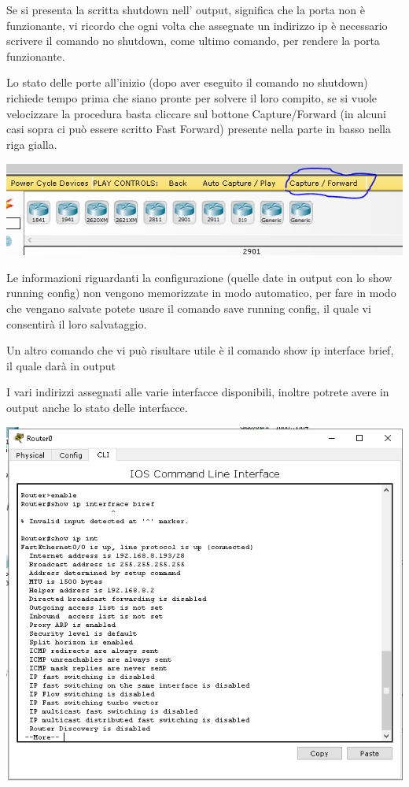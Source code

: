 Se si presenta la scritta shutdown nell’ output, significa che la porta non è funzionante, vi ricordo che ogni volta che assegnate un indirizzo ip è necessario scrivere il comando no shutdown, come ultimo comando, per rendere la porta funzionante.

Lo stato delle porte all'inizio (dopo aver eseguito il comando no shutdown) richiede tempo prima che siano pronte per solvere il loro compito, se si vuole velocizzare la procedura basta cliccare sul bottone Capture/Forward (in alcuni casi sopra ci può essere scritto Fast Forward) presente nella parte in basso nella riga gialla.

\begin{center}
    \includegraphics[width=\linewidth]{images/04.debugging-rete/02.png}
\end{center}

Le informazioni riguardanti la configurazione (quelle date in output con lo show running config) non vengono memorizzate in modo automatico, per fare in modo che vengano salvate potete usare il comando save running config, il quale vi consentirà il loro salvataggio.

Un altro comando che vi può risultare utile è il comando show ip interface brief, il quale darà in output

I vari indirizzi assegnati alle varie interfacce disponibili, inoltre potrete avere in output anche lo stato delle interfacce. 

\begin{center}
    \includegraphics[width=0.8\linewidth]{images/04.debugging-rete/03.png}
\end{center}

